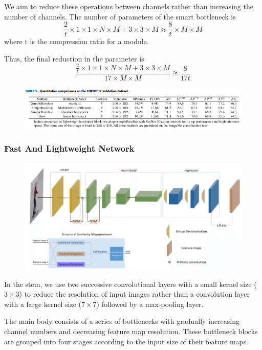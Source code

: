 \documentclass[11pt]{article}
\begin{document}
We aim to reduce these operations between channels rather than increasing the number of channels. The number of parameters of the smart bottleneck is
$$\frac{2}{t}\times 1\times 1\times N\times M+3\times 3\times M \approx \frac{8}{t}\times M\times M$$
where t is the compression ratio for a module.

Thus, the final reduction in the parameter is 
$$\frac{\frac{2}{t}\times 1\times 1\times N\times M+3\times 3\times M}{17 \times M\times M}\approxeq\frac{8}{17t}$$

\begin{figure}[H]
	\centering
	\includegraphics[scale = 0.7]{85}
\end{figure}

\subsubsection{Fast And Lightweight Network}

\begin{figure}[H]
	\centering
	\includegraphics[scale = 0.5]{82}
\end{figure}

In the stem, we use two successive convolutional layers with a small kernel size ($3\times 3$) to reduce the resolution of input images rather than a convolution layer with a large kernel size ($7\times 7$) followed by a max-pooling layer.

The main body consists of a series of bottlenecks with gradually increasing channel numbers and decreasing feature map resolution. These bottleneck blocks are grouped into four stages according to the input size of their feature maps.
\end{document}
